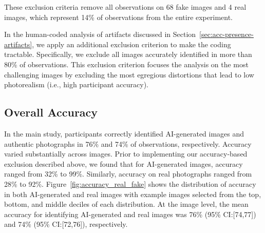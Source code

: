 These exclusion criteria remove all observations on 68 fake images and 4 real images, which represent 14\% of observations from the entire experiment. 

In the human-coded analysis of artifacts discussed in Section~\ref{sec:acc-presence-artifacts}, we apply an additional exclusion criterion to make the coding tractable. Specifically, we exclude all images accurately identified in more than 80\% of observations. This exclusion criterion focuses the analysis on the most challenging images by excluding the most egregious distortions that lead to low photorealism (i.e., high participant accuracy).

\subsection{Overall Accuracy} \label{sec:acc-general}

In the main study, participants correctly identified AI-generated images and authentic photographs in 76\% and 74\% of observations, respectively. Accuracy varied substantially across images. Prior to implementing our accuracy-based exclusion described above, we found that for AI-generated images, accuracy ranged from 32\% to 99\%. Similarly, accuracy on real photographs ranged from 28\% to 92\%. Figure~\ref{fig:accuracy_real_fake} shows the distribution of accuracy in both AI-generated and real images with example images selected from the top, bottom, and middle deciles of each distribution. At the image level, the mean accuracy for identifying AI-generated and real images was 76\% (95\% CI:[74,77]) and 74\% (95\% CI:[72,76]), respectively. 

